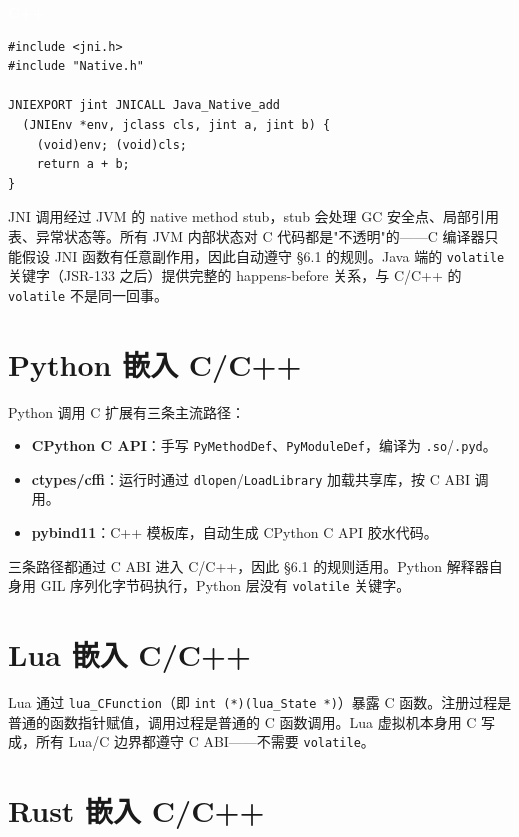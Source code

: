 \documentclass[12pt,a4paper,fontset=fandol]{ctexbook}
\newcommand{\cpplabel}{%
  \begin{tcolorbox}[enhanced,colback=cppheadbg,colframe=cppheadbg,
    arc=1mm,boxrule=0mm,left=6pt,right=6pt,top=2pt,bottom=2pt,
    halign=left,oversize]
    \textcolor{white}{\small\bfseries C++}
  \end{tcolorbox}\vspace{-4pt}}
\newcommand{\cpp}[1]{C++#1}
\newcommand{\kw}[1]{\texttt{#1}}
\begin{document}
\cpplabel
\begin{lstlisting}[style=cppstyle]
#include <jni.h>
#include "Native.h"

JNIEXPORT jint JNICALL Java_Native_add
  (JNIEnv *env, jclass cls, jint a, jint b) {
    (void)env; (void)cls;
    return a + b;
}
\end{lstlisting}

JNI 调用经过 JVM 的 native method stub，stub 会处理 GC 安全点、局部引用表、异常状态等。所有 JVM 内部状态对 C 代码都是"不透明"的——C 编译器只能假设 JNI 函数有任意副作用，因此自动遵守 §6.1 的规则。Java 端的 \kw{volatile} 关键字（JSR-133 之后）提供完整的 happens-before 关系，与 C/\allowbreak{}\cpp{} 的 \kw{volatile} 不是同一回事。

\section{Python 嵌入 C/C++}\label{sec:python-ffi}

Python 调用 C 扩展有三条主流路径：

\begin{itemize}[nosep]
  \item \textbf{CPython C API}：手写 \texttt{PyMethodDef}、\texttt{PyModuleDef}，编译为 \texttt{.so}/\allowbreak{}\texttt{.pyd}。
  \item \textbf{ctypes/cffi}：运行时通过 \texttt{dlopen}/\allowbreak{}\texttt{LoadLibrary} 加载共享库，按 C ABI 调用。
  \item \textbf{pybind11}：\cpp{} 模板库，自动生成 CPython C API 胶水代码。
\end{itemize}

三条路径都通过 C ABI 进入 C/\allowbreak{}\cpp{}，因此 §6.1 的规则适用。Python 解释器自身用 GIL 序列化字节码执行，Python 层没有 \kw{volatile} 关键字。

\section{Lua 嵌入 C/C++}\label{sec:lua-ffi}

Lua 通过 \texttt{lua\_CFunction}（即 \texttt{int (*)(lua\_State *)}）暴露 C 函数。注册过程是普通的函数指针赋值，调用过程是普通的 C 函数调用。Lua 虚拟机本身用 C 写成，所有 Lua/C 边界都遵守 C ABI——不需要 \kw{volatile}。

\section{Rust 嵌入 C/C++}\label{sec:rust-ffi}
\end{document}
